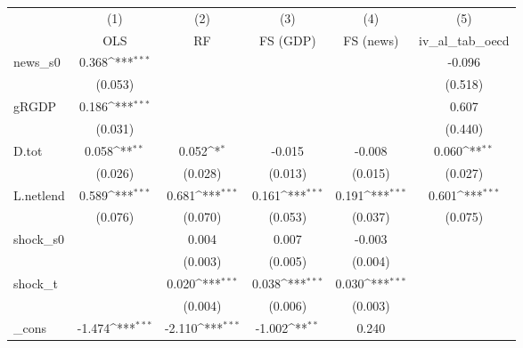 {
\def\sym#1{\ifmmode^{#1}\else\(^{#1}\)\fi}
\begin{tabular}{l*{5}{c}}
\toprule
            &\multicolumn{1}{c}{(1)}&\multicolumn{1}{c}{(2)}&\multicolumn{1}{c}{(3)}&\multicolumn{1}{c}{(4)}&\multicolumn{1}{c}{(5)}\\
            &\multicolumn{1}{c}{OLS}&\multicolumn{1}{c}{RF}&\multicolumn{1}{c}{FS (GDP)}&\multicolumn{1}{c}{FS (news)}&\multicolumn{1}{c}{iv\_al\_tab\_oecd}\\
\midrule
news\_s0     &       0.368\sym{***}&                     &                     &                     &      -0.096         \\
            &     (0.053)         &                     &                     &                     &     (0.518)         \\
\addlinespace
gRGDP       &       0.186\sym{***}&                     &                     &                     &       0.607         \\
            &     (0.031)         &                     &                     &                     &     (0.440)         \\
\addlinespace
D.tot       &       0.058\sym{**} &       0.052\sym{*}  &      -0.015         &      -0.008         &       0.060\sym{**} \\
            &     (0.026)         &     (0.028)         &     (0.013)         &     (0.015)         &     (0.027)         \\
\addlinespace
L.netlend   &       0.589\sym{***}&       0.681\sym{***}&       0.161\sym{***}&       0.191\sym{***}&       0.601\sym{***}\\
            &     (0.076)         &     (0.070)         &     (0.053)         &     (0.037)         &     (0.075)         \\
\addlinespace
shock\_s0    &                     &       0.004         &       0.007         &      -0.003         &                     \\
            &                     &     (0.003)         &     (0.005)         &     (0.004)         &                     \\
\addlinespace
shock\_t     &                     &       0.020\sym{***}&       0.038\sym{***}&       0.030\sym{***}&                     \\
            &                     &     (0.004)         &     (0.006)         &     (0.003)         &                     \\
\addlinespace
\_cons      &      -1.474\sym{***}&      -2.110\sym{***}&      -1.002\sym{**} &       0.240         &                     \\

\end{tabular}}
